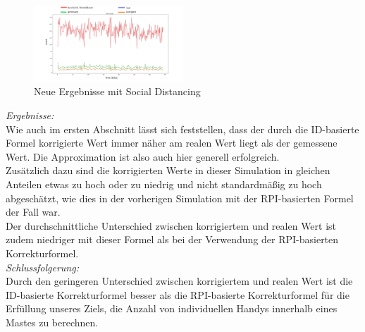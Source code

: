\documentclass[conference,compsoc]{IEEEtran}
\begin{document}
\begin{figure}[h]
	\centering
	\includegraphics[width=0.5\textwidth]{"Mast_Data_Plotted_Social_Distancing"}
	\caption{Neue Ergebnisse mit Social Distancing}
	\label{mast_data_plotted_social_distancing}
\end{figure}

\textit{Ergebnisse:}\\
Wie auch im ersten Abschnitt lässt sich feststellen, dass der durch die ID-basierte Formel korrigierte Wert immer näher am realen Wert liegt als der gemessene Wert. Die Approximation ist also auch hier generell erfolgreich.\\
Zusätzlich dazu sind die korrigierten Werte in dieser Simulation in gleichen Anteilen etwas zu hoch oder zu niedrig und nicht standardmäßig zu hoch abgeschätzt, wie dies in der vorherigen Simulation mit der RPI-basierten Formel der Fall war.\\
Der durchschnittliche Unterschied zwischen korrigiertem und realen Wert ist zudem niedriger mit dieser Formel als bei der Verwendung der RPI-basierten Korrekturformel.\\

\textit{Schlussfolgerung:}\\
Durch den geringeren Unterschied zwischen korrigiertem und realen Wert ist die ID-basierte Korrekturformel besser als die RPI-basierte Korrekturformel für die Erfüllung unseres Ziels, die Anzahl von individuellen Handys innerhalb eines Mastes zu berechnen.\\
\end{document}
